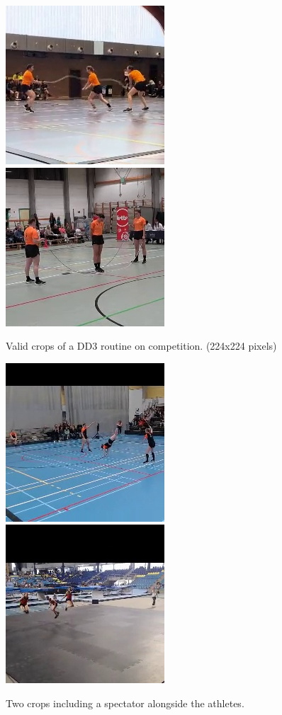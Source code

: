 \begin{figure}
    \centering
    \includegraphics[width=0.45\linewidth]{img/1315_2935}
    \includegraphics[width=0.45\linewidth]{img/2297_134}
    \caption[Valid crops of a DD3 routine on competition.]{Valid crops of a DD3 routine on competition. (224x224 pixels)}
    \label{fig:dd3-crop}
\end{figure}

\begin{figure}
    \centering
    \includegraphics[width=0.45\linewidth]{img/1267_292_cropped}
    \includegraphics[width=0.45\linewidth]{img/1405_1061_cropped}
    \caption[dd3-crop-error]{Two crops including a spectator alongside the athletes.}
    \label{fig:dd3-crop-error}
\end{figure}


